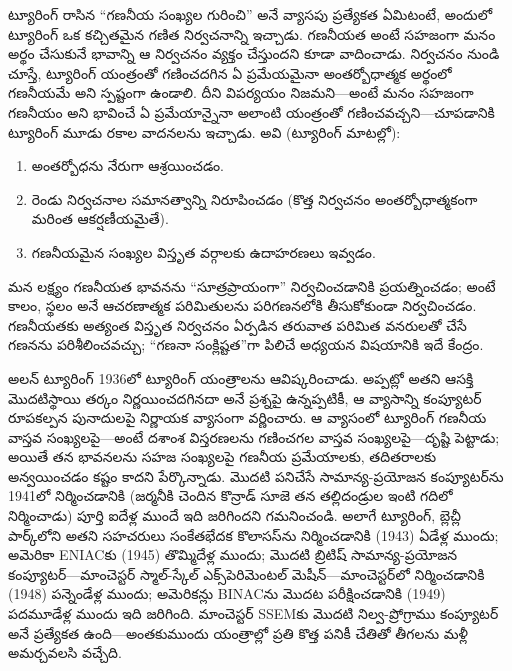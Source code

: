 \documentclass[../../../include/open-logic-section]{subfiles}
\begin{document}
\begin{digress}
ట్యూరింగ్ రాసిన ``గణనీయ సంఖ్యల గురించి'' అనే వ్యాసపు ప్రత్యేకత ఏమిటంటే, అందులో ట్యూరింగ్
ఒక కచ్చితమైన గణిత నిర్వచనాన్ని ఇచ్చాడు. గణనీయత అంటే సహజంగా మనం
అర్థం చేసుకునే భావాన్ని ఆ నిర్వచనం వ్యక్తం చేస్తుందని కూడా వాదించాడు. నిర్వచనం నుండి చూస్తే,
ట్యూరింగ్ యంత్రంతో గణించదగిన ఏ ప్రమేయమైనా అంతర్బోధాత్మక అర్థంలో గణనీయమే
అని స్పష్టంగా ఉండాలి. దీని విపర్యయం నిజమని---అంటే మనం సహజంగా గణనీయం అని
భావించే ఏ ప్రమేయాన్నైనా అలాంటి యంత్రంతో గణించవచ్చని---చూపడానికి ట్యూరింగ్
మూడు రకాల వాదనలను ఇచ్చాడు. అవి (ట్యూరింగ్ మాటల్లో):
\begin{enumerate}
\item అంతర్బోధను నేరుగా ఆశ్రయించడం.
\item రెండు నిర్వచనాల సమానత్వాన్ని నిరూపించడం (కొత్త నిర్వచనం
  అంతర్బోధాత్మకంగా మరింత ఆకర్షణీయమైతే).
\item గణనీయమైన సంఖ్యల విస్తృత వర్గాలకు ఉదాహరణలు ఇవ్వడం.
\end{enumerate}
మన లక్ష్యం గణనీయత భావనను ``సూత్రప్రాయంగా'' నిర్వచించడానికి ప్రయత్నించడం;
అంటే కాలం, స్థలం అనే ఆచరణాత్మక పరిమితులను పరిగణనలోకి తీసుకోకుండా
నిర్వచించడం. గణనీయతకు అత్యంత విస్తృత నిర్వచనం ఏర్పడిన తరువాత పరిమిత
వనరులతో చేసే గణనను పరిశీలించవచ్చు; ``గణనా సంక్లిష్టత''గా పిలిచే అధ్యయన
విషయానికి ఇదే కేంద్రం.
\end{digress}

\begin{history}
అలన్ ట్యూరింగ్ 1936లో ట్యూరింగ్ యంత్రాలను ఆవిష్కరించాడు. అప్పట్లో అతని
ఆసక్తి మొదటిస్థాయి తర్కం నిర్ణయించదగినదా అనే ప్రశ్నపై ఉన్నప్పటికీ, ఆ వ్యాసాన్ని కంప్యూటర్
రూపకల్పన పునాదులపై నిర్ణాయక వ్యాసంగా వర్ణించారు. ఆ వ్యాసంలో ట్యూరింగ్ గణనీయ
వాస్తవ సంఖ్యలపై---అంటే దశాంశ విస్తరణలను గణించగల వాస్తవ సంఖ్యలపై---దృష్టి
పెట్టాడు; అయితే తన భావనలను సహజ సంఖ్యలపై గణనీయ ప్రమేయాలకు, తదితరాలకు
అన్వయించడం కష్టం కాదని పేర్కొన్నాడు. మొదటి పనిచేసే సామాన్య-ప్రయోజన కంప్యూటర్‌ను
1941లో నిర్మించడానికి (జర్మనీకి చెందిన కొన్రాడ్ సూజె తన తల్లిదండ్రుల ఇంటి
గదిలో నిర్మించాడు) పూర్తి ఐదేళ్ల ముందే ఇది జరిగిందని గమనించండి. అలాగే
ట్యూరింగ్, బ్లెచ్లీ పార్క్‌లోని అతని సహచరులు సంకేతభేదక కొలాసస్‌ను నిర్మించడానికి
(1943) ఏడేళ్ల ముందు; అమెరికా ENIACకు (1945) తొమ్మిదేళ్ల ముందు; మొదటి బ్రిటిష్
సామాన్య-ప్రయోజన కంప్యూటర్---మాంచెస్టర్ స్మాల్-స్కేల్ ఎక్స్‌పెరిమెంటల్
మెషీన్---మాంచెస్టర్‌లో నిర్మించడానికి (1948) పన్నెండేళ్ల ముందు; అమెరికన్లు
BINACను మొదట పరీక్షించడానికి (1949) పదమూడేళ్ల ముందు ఇది జరిగింది. మాంచెస్టర్
SSEMకు మొదటి నిల్వ-ప్రోగ్రాము కంప్యూటర్ అనే ప్రత్యేకత ఉంది---అంతకుముందు
యంత్రాల్లో ప్రతి కొత్త పనికీ చేతితో తీగలను మళ్లీ అమర్చవలసి వచ్చేది.
\end{history}
\end{document}
